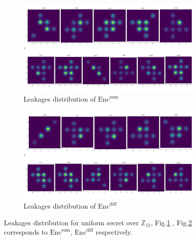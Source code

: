 \documentclass{llncs}
\begin{document}
\begin{figure}
	\centering
	\begin{subfigure}{1\linewidth}
		\centering
		\includegraphics[scale=0.25]{figures/11_dist_sum.png}
		\caption{Leakages distribution of $\text{Enc}^{\text{sum}}$ }
		\label{fig:dist11_sum}
	\end{subfigure} %
	
	\hfill
	
	\begin{subfigure}{1\linewidth}
		\includegraphics[scale=0.25]{figures/11_dist_diff.png}
		\caption{Leakages distribution of $\text{Enc}^{\text{diff}}$ }
		\label{fig:dist11_diff}
	\end{subfigure}
	\caption{Leakages distribution for uniform secret over $\mathbb{Z}_{11}$, Fig.\ref{fig:dist11_sum} , Fig.\ref{fig:dist11_diff} corresponds to $\text{Enc}^{\text{sum}}$, $\text{Enc}^{\text{diff}}$ respectively.}
	\label{fig:dist11}
\end{figure}
\end{document}
